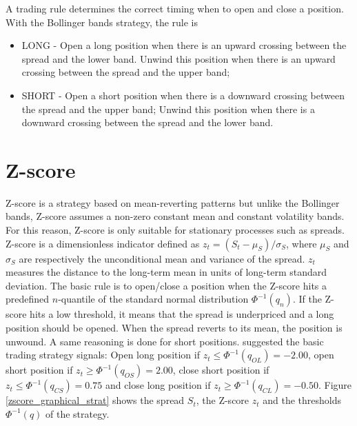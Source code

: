 \documentclass[11pt,a4,twosided,singlespacing,titlepagenumber=on]{scrreprt}
\numberwithin{equation}{chapter} %
\theoremstyle{remark}
\begin{document}
A trading rule determines the correct timing when to open and close a position. With the Bollinger bands strategy, the rule is

\begin{itemize}
\item LONG - Open a long position when there is an upward crossing between the spread and the lower band. Unwind this position when there is an upward crossing between the spread and the upper band;
\item SHORT - Open a short position when there is a downward crossing between the spread and the upper band; Unwind this position when there is a downward crossing between the spread and the lower band.
\end{itemize}

\section{Z-score}
Z-score is a strategy based on mean-reverting patterns but unlike the Bollinger bands, Z-score assumes a non-zero constant mean and constant volatility bands. For this reason, Z-score is only suitable for stationary processes such as spreads. Z-score is a dimensionless indicator defined as $z_t = (S_t-\mu_S) / \sigma_S$, where $\mu_S$ and $\sigma_S$ are respectively the unconditional mean and variance of the spread. $z_t$ measures the distance to the long-term mean in units of long-term standard deviation. The basic rule is to open/close a position when the Z-score hits a predefined $n$-quantile of the standard normal distribution $\Phi^{-1}(q_n)$. If the Z-score hits a low threshold, it means that the spread is underpriced and a long position should be opened. When the spread reverts to its mean, the position is unwound. A same reasoning is done for short positions. \cite{caldeira2013} suggested the basic trading strategy signals: Open long position if $z_t \leq \Phi^{-1}(q_{OL}) = -2.00$, open short position if $z_t \geq \Phi^{-1}(q_{OS}) = 2.00$, close short position if $z_t \leq \Phi^{-1}(q_{CS}) = 0.75$ and close long position if $z_t \geq \Phi^{-1}(q_{CL}) = -0.50$. Figure \ref{zscore_graphical_strat} shows the spread $S_t$, the Z-score $z_t$ and the thresholds $\Phi^{-1}(q)$ of the strategy.
\end{document}
